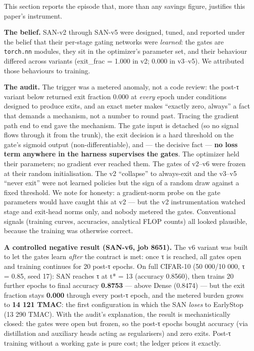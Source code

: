 \documentclass[
]{article}
\begin{document}
This section reports the episode that, more than any savings figure,
justifies this paper's instrument.

\textbf{The belief.} SAN-v2 through SAN-v5 were designed, tuned, and
reported under the belief that their per-stage gating networks were
\emph{learned}: the gates are \texttt{torch.nn} modules, they sit in the
optimizer's parameter set, and their behaviour differed across variants
(exit\_frac = 1.000 in v2; 0.000 in v3--v5). We attributed those
behaviours to training.

\textbf{The audit.} The trigger was a metered anomaly, not a code
review: the post-τ variant below returned exit fraction 0.000 at
\emph{every} epoch under conditions designed to produce exits, and an
exact meter makes ``exactly zero, always'' a fact that demands a
mechanism, not a number to round past. Tracing the gradient path end to
end gave the mechanism. The gate input is detached (so no signal flows
through it from the trunk), the exit decision is a hard threshold on the
gate's sigmoid output (non-differentiable), and --- the decisive fact
--- \textbf{no loss term anywhere in the harness supervises the gates}.
The optimizer held their parameters; no gradient ever reached them. The
gates of v2--v6 were frozen at their random initialisation. The v2
``collapse'' to always-exit and the v3--v5 ``never exit'' were not
learned policies but the sign of a random draw against a fixed
threshold. We note for honesty: a gradient-norm probe on the gate
parameters would have caught this at v2 --- but the v2 instrumentation
watched stage and exit-head norms only, and nobody metered the gates.
Conventional signals (training curves, accuracies, analytical FLOP
counts) all looked plausible, because the training was otherwise
correct.

\textbf{A controlled negative result (SAN-v6, job 8651).} The v6 variant
was built to let the gates learn \emph{after} the contract is met: once
τ is reached, all gates open and training continues for 20 post-τ
epochs. On full CIFAR-10 (50 000/10 000, τ = 0.85, seed 17): SAN reaches
τ at t* = 13 (accuracy 0.8560), then trains 20 further epochs to final
accuracy \textbf{0.8753} --- above Dense (0.8474) --- but the exit
fraction stays \textbf{0.000} through every post-τ epoch, and the
metered burden grows to \textbf{14 121 TMAC}: the first configuration in
which the SAN \emph{loses} to EarlyStop (13 290 TMAC). With the audit's
explanation, the result is mechanistically closed: the gates were open
but frozen, so the post-τ epochs bought accuracy (via distillation and
auxiliary heads acting as regularisers) and zero exits. Post-τ training
without a working gate is pure cost; the ledger prices it exactly.
\end{document}
